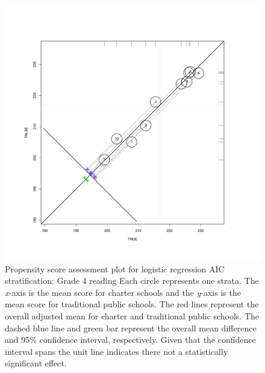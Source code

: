 \begin{figure}
\begin{center}
\includegraphics[trim=0 .7in 0 .7in]{../Figures2009/g4read-circpsa10-AIC.pdf}
\caption[Propensity score assessment plot for logistic regression AIC stratification: Grade 4 reading]{Propensity score assessment plot for logistic regression AIC stratification: Grade 4 reading Each circle represents one strata. The \textit{x}-axis is the mean score for charter schools and the \textit{y}-axis is the mean score for traditional public schools. The red lines represent the overall adjusted mean for charter and traditional public schools. The dashed blue line and green bar represent the overall mean difference and 95\% confidence interval, respectively. Given that the confidence interval spans the unit line indicates there not a statistically significant effect.}
\end{center}
\end{figure}


\clearpage



